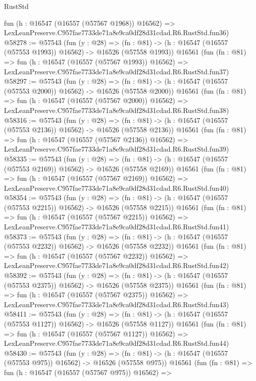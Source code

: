 \begin{lexlean}{RustStd}
\begin{coremodule}
    fun (h : @16547 (@16557 (@57567 @1968)) @16562) =>
    LexLeanPreserve.C957fae7733de71a8e9ca0df28d31cdad.R6.RustStd.fun36)
@58278 := @57543
    (fun (y : @28) =>
    (fn : @81) -> (h : @16547 (@16557 (@57553 @1993)) @16562) -> @16526 (@57558 @1993))
    @16561
    (fun (fn : @81) =>
    fun (h : @16547 (@16557 (@57567 @1993)) @16562) =>
    LexLeanPreserve.C957fae7733de71a8e9ca0df28d31cdad.R6.RustStd.fun37)
@58297 := @57543
    (fun (y : @28) =>
    (fn : @81) -> (h : @16547 (@16557 (@57553 @2000)) @16562) -> @16526 (@57558 @2000))
    @16561
    (fun (fn : @81) =>
    fun (h : @16547 (@16557 (@57567 @2000)) @16562) =>
    LexLeanPreserve.C957fae7733de71a8e9ca0df28d31cdad.R6.RustStd.fun38)
@58316 := @57543
    (fun (y : @28) =>
    (fn : @81) -> (h : @16547 (@16557 (@57553 @2136)) @16562) -> @16526 (@57558 @2136))
    @16561
    (fun (fn : @81) =>
    fun (h : @16547 (@16557 (@57567 @2136)) @16562) =>
    LexLeanPreserve.C957fae7733de71a8e9ca0df28d31cdad.R6.RustStd.fun39)
@58335 := @57543
    (fun (y : @28) =>
    (fn : @81) -> (h : @16547 (@16557 (@57553 @2169)) @16562) -> @16526 (@57558 @2169))
    @16561
    (fun (fn : @81) =>
    fun (h : @16547 (@16557 (@57567 @2169)) @16562) =>
    LexLeanPreserve.C957fae7733de71a8e9ca0df28d31cdad.R6.RustStd.fun40)
@58354 := @57543
    (fun (y : @28) =>
    (fn : @81) -> (h : @16547 (@16557 (@57553 @2215)) @16562) -> @16526 (@57558 @2215))
    @16561
    (fun (fn : @81) =>
    fun (h : @16547 (@16557 (@57567 @2215)) @16562) =>
    LexLeanPreserve.C957fae7733de71a8e9ca0df28d31cdad.R6.RustStd.fun41)
@58373 := @57543
    (fun (y : @28) =>
    (fn : @81) -> (h : @16547 (@16557 (@57553 @2232)) @16562) -> @16526 (@57558 @2232))
    @16561
    (fun (fn : @81) =>
    fun (h : @16547 (@16557 (@57567 @2232)) @16562) =>
    LexLeanPreserve.C957fae7733de71a8e9ca0df28d31cdad.R6.RustStd.fun42)
@58392 := @57543
    (fun (y : @28) =>
    (fn : @81) -> (h : @16547 (@16557 (@57553 @2375)) @16562) -> @16526 (@57558 @2375))
    @16561
    (fun (fn : @81) =>
    fun (h : @16547 (@16557 (@57567 @2375)) @16562) =>
    LexLeanPreserve.C957fae7733de71a8e9ca0df28d31cdad.R6.RustStd.fun43)
@58411 := @57543
    (fun (y : @28) =>
    (fn : @81) -> (h : @16547 (@16557 (@57553 @1127)) @16562) -> @16526 (@57558 @1127))
    @16561
    (fun (fn : @81) =>
    fun (h : @16547 (@16557 (@57567 @1127)) @16562) =>
    LexLeanPreserve.C957fae7733de71a8e9ca0df28d31cdad.R6.RustStd.fun44)
@58430 := @57543
    (fun (y : @28) =>
    (fn : @81) -> (h : @16547 (@16557 (@57553 @975)) @16562) -> @16526 (@57558 @975))
    @16561
    (fun (fn : @81) =>
    fun (h : @16547 (@16557 (@57567 @975)) @16562) =>

\end{coremodule}
\end{lexlean}
